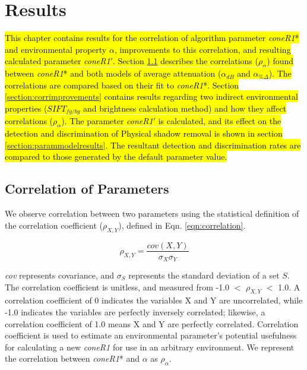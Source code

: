 \clearpage
\chapter{Results}

\hl{This chapter contains results for the correlation of algorithm parameter \textit{coneR1}* and environmental property $\alpha$, improvements to this correlation, and resulting calculated parameter \textit{coneR1}$'$. Section \ref{section:corrofparams} describes the correlations ($\rho_{\alpha}$) found between \textit{coneR1}* and both models of average attenuation ($\alpha_{dB}$ and $\alpha_{\%\Delta}$). The correlations are compared based on their fit to \textit{coneR1}*. Section \ref{section:corrimprovements} contains results regarding two indirect environmental properties ($SIFT_{fg/bg}$ and brightness calculation method) and how they affect correlations ($\rho_{\alpha}$). The parameter \textit{coneR1}$'$ is calculated, and its effect on the detection and discrimination of Physical shadow removal is shown in section \ref{section:parammodelresults}. The resultant detection and discrimination rates are compared to those generated by the default parameter value.}

\section{Correlation of Parameters} \label{section:corrofparams}

We observe correlation between two parameters using the statistical definition of the correlation coefficient ($\rho_{X,Y}$), defined in Eqn. \ref{eqn:correlation}.

\begin{equation}
\rho_{X,Y} = \dfrac{cov(X,Y)}{\sigma_X\sigma_Y}
\label{eqn:correlation}
\end{equation}

\textit{cov} represents covariance, and $\sigma_{S}$ represents the standard deviation of a set $S$. The correlation coefficient is unitless, and measured from -1.0 $<$ $\rho_{X,Y}$ $<$ 1.0. A correlation coefficient of 0 indicates the variables X and Y are uncorrelated, while -1.0 indicates the variables are perfectly inversely correlated; likewise, a correlation coefficient of 1.0 means X and Y are perfectly correlated. Correlation coefficient is used to estimate an environmental parameter's potential usefulness for calculating a new \textit{coneR1} for use in an arbitrary environment. We represent the correlation between \textit{coneR1}* and $\alpha$ as $\rho_{\alpha}$.

